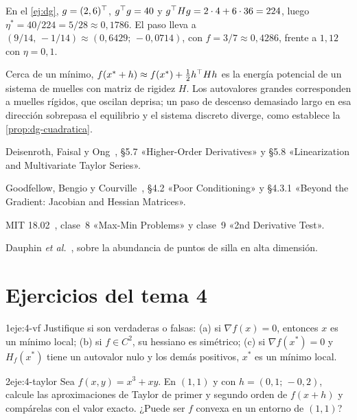 \begin{ejemplo}
En el \cref{ej:dg}, $g=(2,6)^{\top}$, $g^{\top} g=40$ y $g^{\top} Hg=2\cdot 4+6\cdot 36=224$, luego $\eta^{*}=40/224=5/28\approx 0{,}1786$. El paso lleva a $(9/14,\,-1/14)\approx(0{,}6429;\,-0{,}0714)$, con $f=3/7\approx 0{,}4286$, frente a $1{,}12$ con $\eta=0{,}1$.
\end{ejemplo}

\begin{observacion}
Cerca de un mínimo, $f(x^{*}+h)\approx f(x^{*})+\tfrac12h^{\top} Hh$ es la energía potencial de un sistema de muelles con matriz de rigidez $H$. Los autovalores grandes corresponden a muelles rígidos, que oscilan deprisa; un paso de descenso demasiado largo en esa dirección sobrepasa el equilibrio y el sistema discreto diverge, como establece la \cref{prop:dg-cuadratica}.
\end{observacion}

\begin{lecturas}
\item Deisenroth, Faisal y Ong~\cite{mml}, §5.7 «Higher-Order Derivatives» y §5.8 «Linearization and Multivariate Taylor Series».
\item Goodfellow, Bengio y Courville~\cite{gbc}, §4.2 «Poor Conditioning» y §4.3.1 «Beyond the Gradient: Jacobian and Hessian Matrices».
\item MIT 18.02~\cite{mit1802}, clase~8 «Max-Min Problems» y clase~9 «2nd Derivative Test».
\item Dauphin \emph{et al.}~\cite{dauphin}, sobre la abundancia de puntos de silla en alta dimensión.
\end{lecturas}

\section*{Ejercicios del tema 4}

\begin{ejercicio}{1}{eje:4-vf}
Justifique si son verdaderas o falsas: (a) si $\nabla f(x)=0$, entonces $x$ es un mínimo local; (b) si $f\in C^{2}$, su hessiano es simétrico; (c) si $\nabla f(x^{*})=0$ y $H_f(x^{*})$ tiene un autovalor nulo y los demás positivos, $x^{*}$ es un mínimo local.
\end{ejercicio}

\begin{ejercicio}{2}{eje:4-taylor}
Sea $f(x,y)=x^{3}+xy$. En $(1,1)$ y con $h=(0{,}1;\,-0{,}2)$, calcule las aproximaciones de Taylor de primer y segundo orden de $f(x+h)$ y compárelas con el valor exacto. ¿Puede ser $f$ convexa en un entorno de $(1,1)$?
\end{ejercicio}

